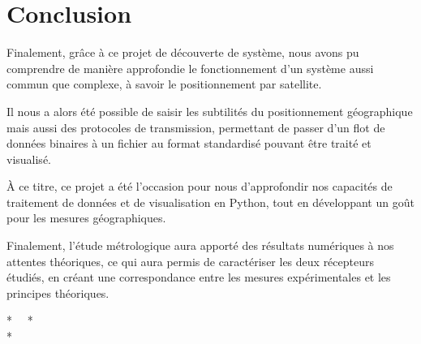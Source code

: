\section*{Conclusion}
   Finalement, grâce à ce projet de découverte de système, nous avons pu comprendre de manière approfondie le fonctionnement d'un système aussi commun que complexe, à savoir le positionnement par satellite.

   Il nous a alors été possible de saisir les subtilités du positionnement géographique mais aussi des protocoles de transmission, permettant de passer d'un flot de données binaires à un fichier au format standardisé pouvant être traité et visualisé.

   À ce titre, ce projet a été l'occasion pour nous d'approfondir nos capacités de traitement de données et de visualisation en Python, tout en développant un goût pour les mesures géographiques.

   Finalement, l'étude métrologique aura apporté des résultats numériques à nos attentes théoriques, ce qui aura permis de caractériser les deux récepteurs étudiés, en créant une correspondance entre les mesures expérimentales et les principes théoriques.

   \vspace{3cm}
   \begin{center}
   *  \ \ *\\
   *
   \end{center}